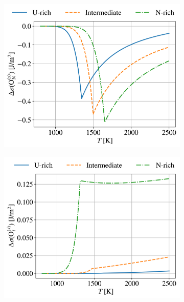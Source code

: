 \documentclass[preprint,12pt,sort&compress]{elsarticle}
\newcommand{\?}{\stackrel{?}{=}}
\begin{document}
\begin{figure}[h!]
\centering
\begin{subfigure}{0.48\textwidth}
    \includegraphics[width=\textwidth]{Delta1.png}
    \caption{}
    \label{Fig:D1}
\end{subfigure}
\hfill
\begin{subfigure}{0.48\textwidth}
    \includegraphics[width=\textwidth]{Delta2.png}
    \caption{}
    \label{Fig:D2}
\end{subfigure}
\hfill
\begin{subfigure}{0.48\textwidth}

\end{subfigure}
\end{figure}
\end{document}
